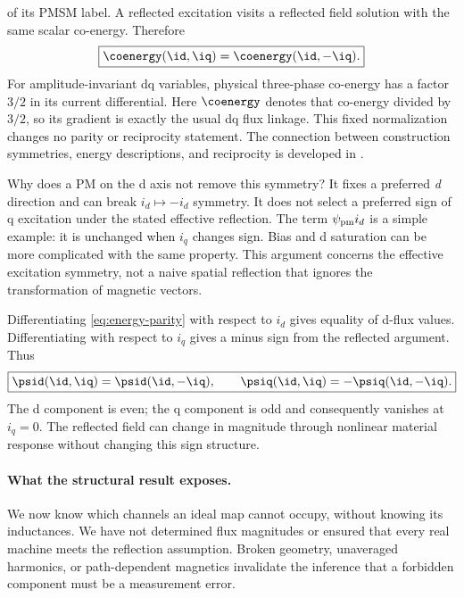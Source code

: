 of its PMSM label. A reflected excitation visits a reflected field solution
with the same scalar co-energy. Therefore
\begin{equation}
 \boxed{\coenergy(\id,\iq)=\coenergy(\id,-\iq).}\label{eq:energy-parity}
\end{equation}
For amplitude-invariant dq variables, physical three-phase co-energy has a
factor $3/2$ in its current differential. Here $\coenergy$ denotes that co-energy
divided by $3/2$, so its gradient is exactly the usual dq flux linkage.
This fixed normalization changes no parity or reciprocity statement.
The connection between construction symmetries, energy descriptions, and
reciprocity is developed in \cite{jebai2014}.

Why does a PM on the d axis not remove this symmetry? It fixes a preferred
\emph{d} direction and can break $i_d\mapsto-i_d$ symmetry. It does not select
a preferred sign of q excitation under the stated effective reflection.
The term $\psi_{\rm pm}i_d$ is a simple example: it is unchanged when $i_q$
changes sign. Bias and d saturation can be more complicated with the same
property. This argument concerns the effective excitation symmetry, not a
naive spatial reflection that ignores the transformation of magnetic vectors.

Differentiating \cref{eq:energy-parity} with respect to $i_d$ gives equality
of d-flux values. Differentiating with respect to $i_q$ gives a minus sign
from the reflected argument. Thus
\begin{equation}
 \boxed{\psid(\id,\iq)=\psid(\id,-\iq),\qquad
 \psiq(\id,\iq)=-\psiq(\id,-\iq).}\label{eq:flux-parity}
\end{equation}
The d component is even; the q component is odd and consequently vanishes at
$i_q=0$. The reflected field can change in magnitude through nonlinear
material response without changing this sign structure.


\paragraph{What the structural result exposes.}
We now know which channels an ideal map cannot occupy, without knowing its
inductances. We have not determined flux magnitudes or ensured that every
real machine meets the reflection assumption. Broken geometry, unaveraged
harmonics, or path-dependent magnetics invalidate the inference that a
forbidden component must be a measurement error.

